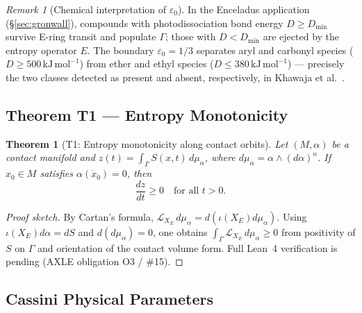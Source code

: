 \documentclass[12pt]{article}
\numberwithin{equation}{section}
\newtheorem{theorem}{Theorem}[section]
\theoremstyle{remark}
\newtheorem{remark}{Remark}[section]
\begin{document}
\begin{remark}[Chemical interpretation of $\varepsilon_0$]
In the Enceladus application (\S\ref{sec:gronwall}), compounds with photodissociation
bond energy $D \geq D_{\min}$ survive E-ring transit and populate $\Gamma$; those
with $D < D_{\min}$ are ejected by the entropy operator $E$.
The boundary $\varepsilon_0 = 1/3$ separates aryl and carbonyl species
($D\geq 500\,\mathrm{kJ\,mol}^{-1}$) from ether and ethyl species
($D\leq 380\,\mathrm{kJ\,mol}^{-1}$) --- precisely the two classes detected
as present and absent, respectively, in Khawaja et al.~\cite{Khawaja2025}.
\end{remark}

\subsection{Theorem T1 --- Entropy Monotonicity}

\begin{theorem}[T1: Entropy monotonicity along contact orbits]
Let $(M,\alpha)$ be a contact manifold and
$z(t) = \int_\Gamma S(x,t)\,d\mu_\alpha$,
where $d\mu_\alpha = \alpha\wedge(d\alpha)^n$.
If $x_0\in M$ satisfies $\alpha(\dot{x}_0)=0$, then
\[
  \frac{dz}{dt} \geq 0 \quad\text{for all }t>0.
\]
\end{theorem}

\begin{proof}[Proof sketch]
By Cartan's formula,
$\mathcal{L}_{X_E}\,d\mu_\alpha = d(\iota(X_E)d\mu_\alpha)$.
Using $\iota(X_E)d\alpha = dS$ and $d(d\mu_\alpha)=0$, one obtains
$\int_\Gamma \mathcal{L}_{X_E}\,d\mu_\alpha\geq 0$ from positivity of $S$ on $\Gamma$
and orientation of the contact volume form.
Full Lean~4 verification is pending (AXLE obligation O3 / \#15).
\end{proof}

\subsection{Cassini Physical Parameters}
\end{document}
